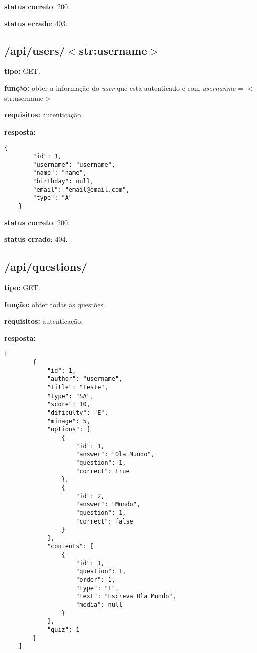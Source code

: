 \documentclass[11pt,a4paper]{report}
\begin{document}
\textbf{status correto}: 200.

\textbf{status errado}: 403.


\subsection{/api/users/$<$str:username$>$}

\textbf{tipo:} GET.

\textbf{função:} obter a informação do \emph{user} que esta autenticado e com \emph{usernanme} = $<$str:username$>$

\textbf{requisitos:} autenticação.

\textbf{resposta:}

\begin{lstlisting}[style = code]
   {
        "id": 1,
        "username": "username",
        "name": "name",
        "birthday": null,
        "email": "email@email.com",
        "type": "A"
    }
\end{lstlisting}

\textbf{status correto}: 200.

\textbf{status errado}: 404.

\newpage

\subsection{/api/questions/}

\textbf{tipo:} GET.

\textbf{função:} obter todas as questões.

\textbf{requisitos:} autenticação.

\textbf{resposta:}

\begin{lstlisting}[style = code]
    [
        {
            "id": 1,
            "author": "username",
            "title": "Teste",
            "type": "SA",
            "score": 10,
            "dificulty": "E",
            "minage": 5,
            "options": [
                {
                    "id": 1,
                    "answer": "Ola Mundo",
                    "question": 1,
                    "correct": true
                },
                {
                    "id": 2,
                    "answer": "Mundo",
                    "question": 1,
                    "correct": false
                }
            ],
            "contents": [
                {
                    "id": 1,
                    "question": 1,
                    "order": 1,
                    "type": "T",
                    "text": "Escreva Ola Mundo",
                    "media": null
                }
            ],
            "quiz": 1
        }
    ]
\end{lstlisting}
\end{document}
